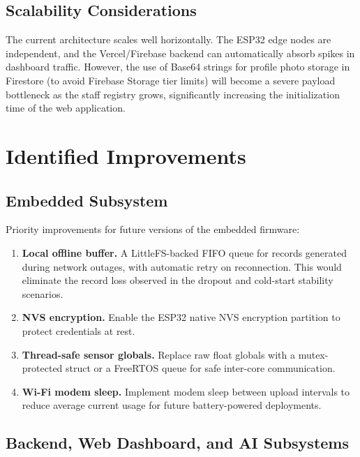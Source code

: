 \subsection{Scalability Considerations}
The current architecture scales well horizontally. The ESP32 edge nodes are independent, and the Vercel/Firebase backend can automatically absorb spikes in dashboard traffic. However, the use of Base64 strings for profile photo storage in Firestore (to avoid Firebase Storage tier limits) will become a severe payload bottleneck as the staff registry grows, significantly increasing the initialization time of the web application.

\section{Identified Improvements}

\subsection*{Embedded Subsystem}

Priority improvements for future versions of the embedded firmware:

\begin{enumerate}
	\item \textbf{Local offline buffer.}
	      A LittleFS-backed FIFO queue for records generated during network outages,
	      with automatic retry on reconnection.
	      This would eliminate the record loss observed in the dropout and cold-start
	      stability scenarios.

	\item \textbf{NVS encryption.}
	      Enable the ESP32 native NVS encryption partition to protect credentials at rest.

	\item \textbf{Thread-safe sensor globals.}
	      Replace raw float globals with a mutex-protected struct or a FreeRTOS queue
	      for safe inter-core communication.

	\item \textbf{Wi-Fi modem sleep.}
	      Implement modem sleep between upload intervals to reduce average current usage for future battery-powered deployments.
\end{enumerate}

\subsection*{Backend, Web Dashboard, and AI Subsystems}

